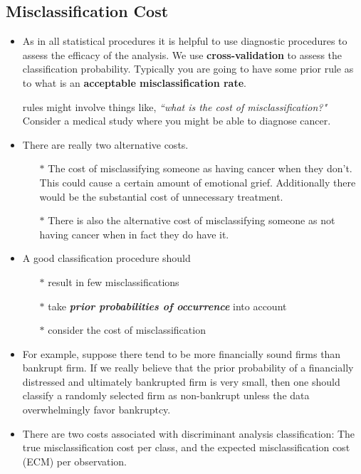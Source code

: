 \subsection{Misclassification Cost}
\begin{itemize}
\item As in all statistical procedures it is helpful to use diagnostic procedures to assess the efficacy of the analysis. We use \textbf{cross-validation} to assess the classification probability.
Typically you are going to have some prior rule as to what is an \textbf{acceptable misclassification rate}.

\itemThose rules might involve things like, \textit{``what is the cost of misclassification?"} Consider a medical study where you might be able to diagnose cancer.

\item There are really two alternative costs. 
\begin{itemize}
\item[$\ast$] The cost of misclassifying someone as having cancer when they don't.
This could cause a certain amount of emotional grief. Additionally there would be the substantial cost of unnecessary treatment.

\item[$\ast$] There is also the alternative cost of misclassifying someone as not having cancer when in fact they do have it.
\end{itemize}
\item A good classification procedure should
\begin{itemize}
\item[$\ast$] result in few misclassifications
\item[$\ast$] take \textbf{\textit{prior probabilities of occurrence}} into account
\item[$\ast$] consider the cost of misclassification
\end{itemize}

\item For example, suppose there tend to be more financially sound firms than bankrupt
firm. If we really believe that the prior probability of a financially
distressed and ultimately bankrupted firm is very small, then one should
classify a randomly selected firm as non-bankrupt unless the data
overwhelmingly favor bankruptcy.



\item There are two costs associated with discriminant analysis classification: The true misclassification cost per class, and the expected misclassification cost (ECM) per observation.


\end{itemize}
